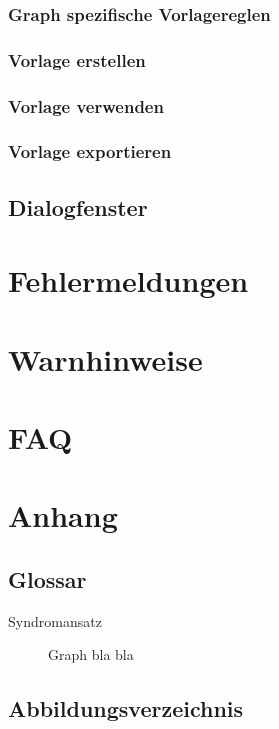 \documentclass[enabledeprecatedfontcommands,fontsize=11pt,paper=a4,twoside]{scrartcl}
\begin{document}
		\subsubsection{Graph spezifische Vorlagereglen}
		\subsubsection{Vorlage erstellen}
		\subsubsection{Vorlage verwenden}
		\subsubsection{Vorlage exportieren}
	\subsection{Dialogfenster} \label{dialog}
	\newpage
	\section{Fehlermeldungen} \label{fehlermeldungen}
	
	
\section{Warnhinweise} \label{sec:warnhinweise}
	
	
	
	
\section{FAQ}
\newpage
\section{Anhang} \label{sec:anhang}	
	\subsection{Glossar}
	
	\begin{description}
		\item[Syndromansatz] Graph bla bla
	\end{description}
	
	\subsection{Abbildungsverzeichnis}
	\listoffigures
	

\newpage



\end{document}

